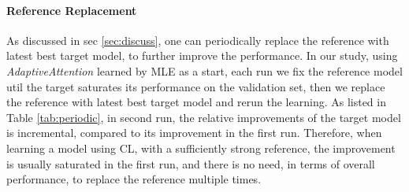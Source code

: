 \vspace{-5pt}
\paragraph{Reference Replacement} As discussed in sec \ref{sec:discuss},
one can periodically replace the reference with latest best target model,
to further improve the performance.
In our study, using \emph{AdaptiveAttention} learned by MLE as a start,
each run we fix the reference model util the target saturates its performance on the validation set,
then we replace the reference with latest best target model 
and rerun the learning.
As listed in Table \ref{tab:periodic},
in second run, the relative improvements of the target model is incremental,
compared to its improvement in the first run.
Therefore, when learning a model using CL,
with a sufficiently strong reference,
the improvement is usually saturated in the first run,
and there is no need, in terms of overall performance,
to replace the reference multiple times.



